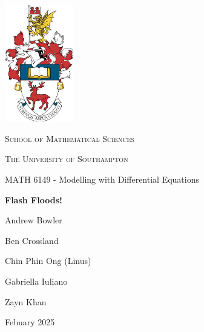 \documentclass[12pt]{article}
\begin{document}


\begin{titlepage}
    \centering
    \includegraphics[width=3cm]{Swings/Figures/crest.jpg}\par
    \vspace{0.3cm}
    {\scshape\Large School of Mathematical Sciences \par}
    \vspace{0.25cm}
    {\scshape\Large The University of Southampton \par}
    \vspace{0.25cm}
    {\Large MATH 6149 - Modelling with Differential Equations \par}
    \vspace{0.5cm}
    {\huge\bfseries Flash Floods!\par}
    \vspace{0.5cm}
    {\Large Andrew Bowler \par}
    \vspace{0.25cm}
    {\Large Ben Crossland \par}
    \vspace{0.25cm}
    {\Large Chin Phin Ong (Linus) \par}
    \vspace{0.25cm}
    {\Large Gabriella Iuliano\par} %
    \vspace{0.25cm}
    {\Large Zayn Khan \par}
    {\large  \par}
    \vfill
    {\large Febuary 2025 \par}
\end{titlepage}
\end{document}
